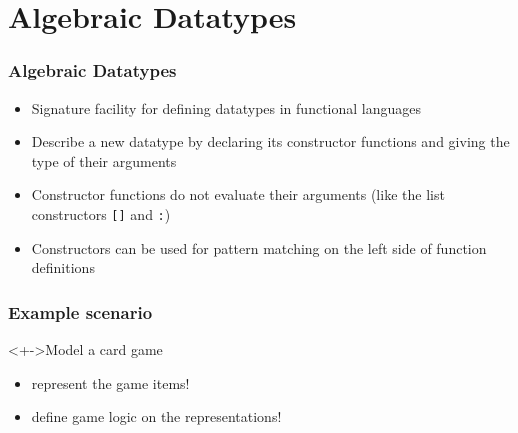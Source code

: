 \documentclass{beamer}
\begin{document}
\section{Algebraic Datatypes}
\begin{frame}
  \frametitle{Algebraic Datatypes}
  \begin{itemize}
  \item Signature facility for defining datatypes in functional
    languages
  \item Describe a new datatype by declaring its \alert{constructor function}s and
    giving the type of their arguments
  \item Constructor functions do not evaluate their arguments (like the list
    constructors \lstinline{[]} and \lstinline{:})
  \item Constructors can be used for \alert{pattern matching} on the left side of
    function definitions
  \end{itemize}
\end{frame}
\begin{frame}[fragile]
  \frametitle{Example scenario}
  \begin{block}<+->{Model a card game}
    \begin{itemize}
    \item represent the game items!
    \item define game logic on the representations!
    \end{itemize}
  \end{block}
\end{frame}
\end{document}
